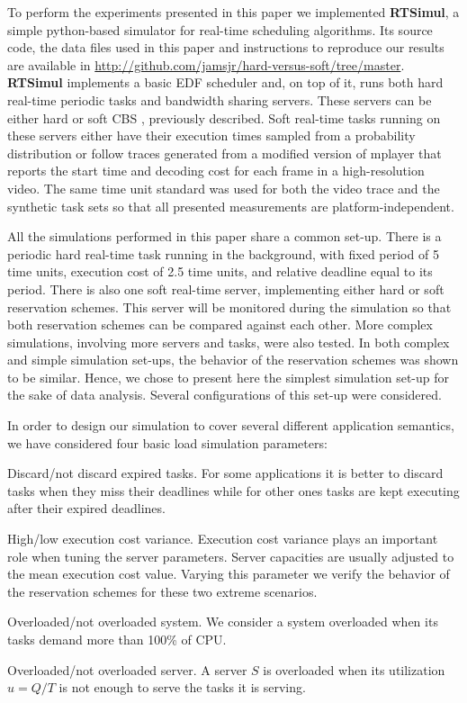 \documentclass[times, 10pt,twocolumn]{article}
\newcommand{\simul}{\textbf{RTSimul}} %
\begin{document}
To perform the experiments presented in this paper we implemented
\simul{}, a simple python-based simulator for real-time scheduling
algorithms. Its source code, the data files used in this paper and
instructions to reproduce our results are available in
\url{http://github.com/jamsjr/hard-versus-soft/tree/master}. \simul{}
implements a basic EDF scheduler and, on top of it, runs both hard
real-time periodic tasks and bandwidth sharing servers. These servers
can be either hard \cite{buttazzo05:soft} or soft CBS \cite{abeni.ea98:integrating}, previously
described. Soft real-time tasks running on these servers
either have their execution times sampled from a probability
distribution or follow traces generated from a modified version of
mplayer that reports the start time and decoding cost for each frame
in a high-resolution video. The same time unit standard was used for
both the video trace and the synthetic task sets so that all presented
measurements are platform-independent.

All the simulations performed in this paper share a common
set-up. There is a periodic hard real-time task running in the
background, with fixed period of 5 time units, execution cost of 2.5
time units, and relative deadline equal to its period.  There is also
one soft real-time server, implementing either hard or soft
reservation schemes.  This server will be monitored during the
simulation so that both reservation schemes can be compared against
each other. More complex simulations, involving more servers and
tasks, were also tested. In both complex and simple simulation
set-ups, the behavior of the reservation schemes was shown to be
similar. Hence, we chose to present here the simplest simulation
set-up for the sake of data analysis.  Several configurations of this
set-up were considered.

\label{sec:configurations}

In order to design our simulation to cover several different
application semantics, we have considered four basic load simulation
parameters:
\begin{description}
\item Discard/not discard expired tasks. For some applications it is
  better to discard tasks when they miss their deadlines while for
  other ones tasks are kept executing after their expired deadlines.
\item High/low execution cost variance. Execution cost variance plays
  an important role when tuning the server parameters. Server
  capacities are usually adjusted to the mean execution cost
  value. Varying this parameter we verify the behavior of the
  reservation schemes for these two extreme scenarios.
\item Overloaded/not overloaded system. We consider a system
  overloaded when its tasks demand more than 100\% of CPU.
\item Overloaded/not overloaded server. A server $S$ is overloaded
  when its utilization $u = Q/T$ is not enough to serve the
  tasks it is serving.
\end{description}
\end{document}

